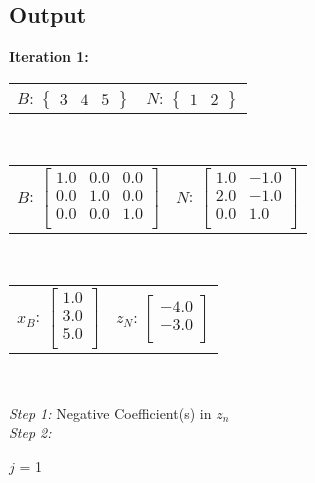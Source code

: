 \documentclass{article}
\begin{document}
\subsection{Output}

\textbf{Iteration 1: }

\begin{center}
\begin{tabular}{cc}$B$: ${\left\{\begin{array}{ccc}3 & 4 & 5\end{array}\right\}}$ & $N$: ${\left\{\begin{array}{cc}1 & 2\end{array}\right\}}$\end{tabular}\\

\begin{tabular}{cc}$B$: $\left[\begin{array}{ccc}1.0 & 0.0 & 0.0\\ 0.0 & 1.0 & 0.0\\ 0.0 & 0.0 & 1.0\\ \end{array}\right]$ & $N$: $\left[\begin{array}{cc}1.0 & -1.0\\ 2.0 & -1.0\\ 0.0 & 1.0\\ \end{array}\right]$\end{tabular}\\

\begin{tabular}{cc}$x_B$: $\left[\begin{array}{c}1.0\\ 3.0\\ 5.0\\ \end{array}\right]$ & $z_N$: $\left[\begin{array}{c}-4.0\\ -3.0\\ \end{array}\right]$\end{tabular}\\

\end{center}
\textit{Step 1:}
Negative Coefficient(s) in $z_n$
\\\textit{Step 2:}\\
\begin{center}
$j$ = 1
\end{center}
\end{document}
